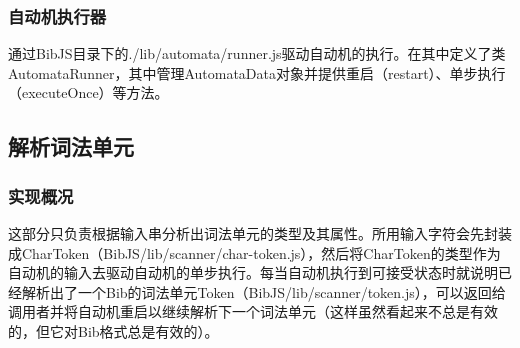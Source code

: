 \documentclass[a4paper]{article}
\begin{document}
\begin{CJK*}{UTF8}{gbsn}
    \subsubsection{自动机执行器}
    通过BibJS目录下的./lib/automata/runner.js驱动自动机的执行。在其中定义了类AutomataRunner，其中管理AutomataData对象并提供重启（restart）、单步执行（executeOnce）等方法。

    \subsection{解析词法单元}
    \subsubsection{实现概况}
    这部分只负责根据输入串分析出词法单元的类型及其属性。所用输入字符会先封装成CharToken（BibJS/lib/scanner/char-token.js），然后将CharToken的类型作为自动机的输入去驱动自动机的单步执行。每当自动机执行到可接受状态时就说明已经解析出了一个Bib的词法单元Token（BibJS/lib/scanner/token.js），可以返回给调用者并将自动机重启以继续解析下一个词法单元（这样虽然看起来不总是有效的，但它对Bib格式总是有效的）。


\end{CJK*}
\end{document}
